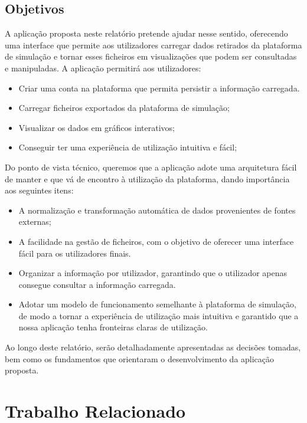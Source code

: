 \section{Objetivos}

A aplicação proposta neste relatório pretende ajudar nesse sentido, oferecendo uma interface que permite aos utilizadores carregar dados retirados da plataforma de simulação e tornar esses ficheiros em visualizações que podem ser consultadas e manipuladas. A aplicação permitirá aos utilizadores:

\begin{itemize}
    \item Criar uma conta na plataforma que permita persistir a informação carregada.
    \item Carregar ficheiros exportados da plataforma de simulação;
    \item Visualizar os dados em gráficos interativos;
    \item Conseguir ter uma experiência de utilização intuitiva e fácil;
\end{itemize}

Do ponto de vista técnico, queremos que a aplicação adote uma arquitetura fácil de manter e que vá de encontro à utilização da plataforma, dando importância aos seguintes itens:
\begin{itemize}
    \item A normalização e transformação automática de dados provenientes de fontes externas;
    \item A facilidade na gestão de ficheiros, com o objetivo de oferecer uma interface fácil para os utilizadores finais.
    \item Organizar a informação por utilizador, garantindo que o utilizador apenas consegue consultar a informação carregada.
    \item Adotar um modelo de funcionamento semelhante à plataforma de simulação, de modo a tornar a experiência de utilização mais intuitiva e garantido que a nossa aplicação tenha fronteiras claras de utilização.
\end{itemize}

Ao longo deste relatório, serão detalhadamente apresentadas as decisões tomadas, bem como os fundamentos que orientaram o desenvolvimento da aplicação proposta.

\chapter{Trabalho Relacionado}
\label{ch:trabalhoRelacionado}

